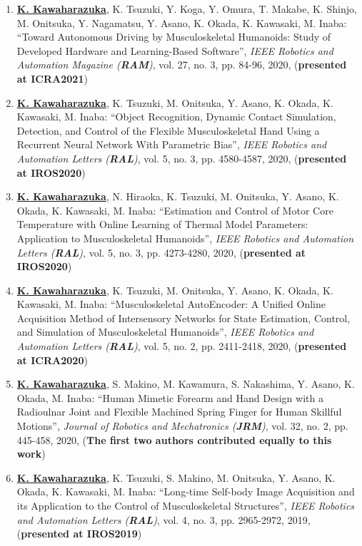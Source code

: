\documentclass[letterpaper]{article}
\begin{document}
\begin{enumerate}
\item \underline{\textbf{K. Kawaharazuka}}, K. Tsuzuki, Y. Koga, Y. Omura, T. Makabe, K. Shinjo, M. Onitsuka, Y. Nagamatsu, Y. Asano, K. Okada, K. Kawasaki, M. Inaba: ``Toward Autonomous Driving by Musculoskeletal Humanoids: Study of Developed Hardware and Learning-Based Software'', \textit{IEEE Robotics and Automation Magazine (\textit{\textbf{RAM}})}, vol. 27, no. 3, pp. 84-96, 2020, (\textbf{presented at ICRA2021})
\item \underline{\textbf{K. Kawaharazuka}}, K. Tsuzuki, M. Onitsuka, Y. Asano, K. Okada, K. Kawasaki, M. Inaba: ``Object Recognition, Dynamic Contact Simulation, Detection, and Control of the Flexible Musculoskeletal Hand Using a Recurrent Neural Network With Parametric Bias'', \textit{IEEE Robotics and Automation Letters (\textit{\textbf{RAL}})}, vol. 5, no. 3, pp. 4580-4587, 2020, (\textbf{presented at IROS2020})
\item \underline{\textbf{K. Kawaharazuka}}, N. Hiraoka, K. Tsuzuki, M. Onitsuka, Y. Asano, K. Okada, K. Kawasaki, M. Inaba: ``Estimation and Control of Motor Core Temperature with Online Learning of Thermal Model Parameters: Application to Musculoskeletal Humanoids'', \textit{IEEE Robotics and Automation Letters (\textit{\textbf{RAL}})}, vol. 5, no. 3, pp. 4273-4280, 2020, (\textbf{presented at IROS2020})
\item \underline{\textbf{K. Kawaharazuka}}, K. Tsuzuki, M. Onitsuka, Y. Asano, K. Okada, K. Kawasaki, M. Inaba: ``Musculoskeletal AutoEncoder: A Unified Online Acquisition Method of Intersensory Networks for State Estimation, Control, and Simulation of Musculoskeletal Humanoids'', \textit{IEEE Robotics and Automation Letters (\textit{\textbf{RAL}})}, vol. 5, no. 2, pp. 2411-2418, 2020, (\textbf{presented at ICRA2020})
\item \underline{\textbf{K. Kawaharazuka}}, S. Makino, M. Kawamura, S. Nakashima, Y. Asano, K. Okada, M. Inaba: ``Human Mimetic Forearm and Hand Design with a Radioulnar Joint and Flexible Machined Spring Finger for Human Skillful Motions'', \textit{Journal of Robotics and Mechatronics (\textit{\textbf{JRM}})}, vol. 32, no. 2, pp. 445-458, 2020, (\textbf{The first two authors contributed equally to this work})
\item \underline{\textbf{K. Kawaharazuka}}, K. Tsuzuki, S. Makino, M. Onitsuka, Y. Asano, K. Okada, K. Kawasaki, M. Inaba: ``Long-time Self-body Image Acquisition and its Application to the Control of Musculoskeletal Structures'', \textit{IEEE Robotics and Automation Letters (\textit{\textbf{RAL}})}, vol. 4, no. 3, pp. 2965-2972, 2019, (\textbf{presented at IROS2019})

\end{enumerate}
\end{document}
